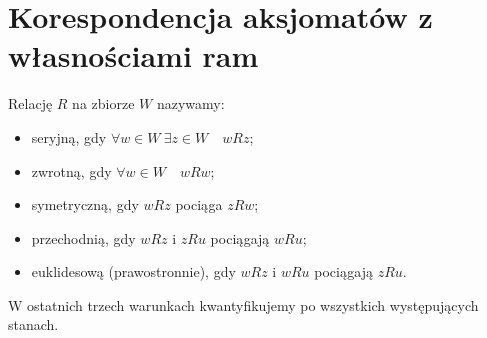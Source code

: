 \section{Korespondencja aksjomatów z własnościami ram}

\begin{definicja}
\label{def:ncl-kripke-relation-properties}
Relację $R$ na zbiorze $W$ nazywamy:
\begin{itemize}
 \item seryjną, gdy $\forall w\in W\ \exists z\in W\quad wRz$;
 \item zwrotną, gdy $\forall w\in W\quad wRw$;
 \item symetryczną, gdy $wRz$ pociąga $zRw$;
 \item przechodnią, gdy $wRz$ i $zRu$ pociągają $wRu$;
 \item euklidesową (prawostronnie), gdy $wRz$ i $wRu$
       pociągają $zRu$.
\end{itemize}
W ostatnich trzech warunkach kwantyfikujemy
po wszystkich występujących stanach.
\end{definicja}

